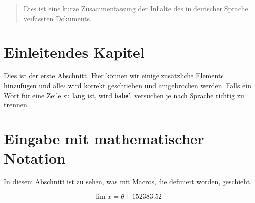 \documentclass{article}
\begin{document}
\tableofcontents

\vspace{2cm} %

\begin{abstract}
Dies ist eine kurze Zusammenfassung der Inhalte des in deutscher Sprache
verfassten Dokuments.
\end{abstract}

\section{Einleitendes Kapitel}
Dies ist der erste Abschnitt. Hier können wir einige zusätzliche Elemente
hinzufügen und alles wird korrekt geschrieben und umgebrochen werden. Falls ein
Wort für eine Zeile zu lang ist, wird \texttt{babel} versuchen je nach Sprache
richtig zu trennen.

\section{Eingabe mit mathematischer Notation}
In diesem Abschnitt ist zu sehen, was mit Macros, die definiert worden,
geschieht.

\[ \lim x =  \theta + 152383.52 \]
\end{document}
